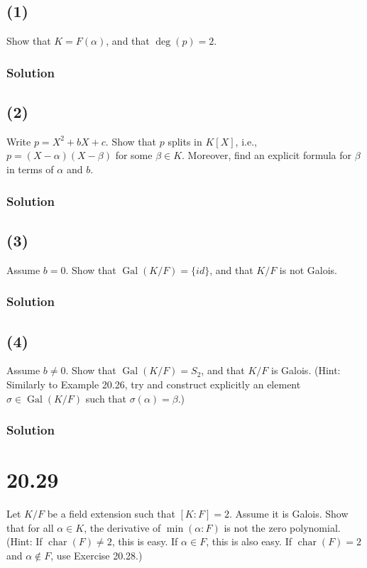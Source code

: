 \documentclass[fleqn]{article}
\DeclareMathOperator{\Gal}{Gal}
\DeclareMathOperator{\Char}{char}
\begin{document}
        \subsection{(1)}
        Show that $K = F(\alpha)$, and that $\deg(p) = 2$.
            
            \subsubsection{Solution}
            
        
        \subsection{(2)}
        Write $p = X^2 + bX + c$.  Show that $p$ splits in $K[X]$, i.e., $p = (X - \alpha)(X - \beta)$ for some $\beta \in K$.  Moreover, find an explicit formula for $\beta$ in terms of $\alpha$ and $b$.
            
            \subsubsection{Solution}
            
        
        \subsection{(3)}
        Assume $b = 0$.  Show that $\Gal(K/F) = \{id\}$, and that $K/F$ is not Galois.
            
            \subsubsection{Solution}
            
        
        \subsection{(4)}
        Assume $b \neq 0$.  Show that $\Gal(K/F) = S_2$, and that $K/F$ is Galois.  (Hint: Similarly to Example 20.26, try and construct explicitly an element $\sigma \in \Gal(K/F)$ such that $\sigma(\alpha) = \beta$.)
        
            \subsubsection{Solution}
            
    
    \section{20.29}
    Let $K/F$ be a field extension such that $[K : F] = 2$.  Assume it is Galois.  Show that for all $\alpha \in K$, the derivative of $\min(\alpha : F)$ is not the zero polynomial.  (Hint: If $\Char(F) \neq 2$, this is easy.  If $\alpha \in F$, this is also easy.  If $\Char(F) = 2$ and $\alpha \notin F$, use Exercise 20.28.)
        
\end{document}
